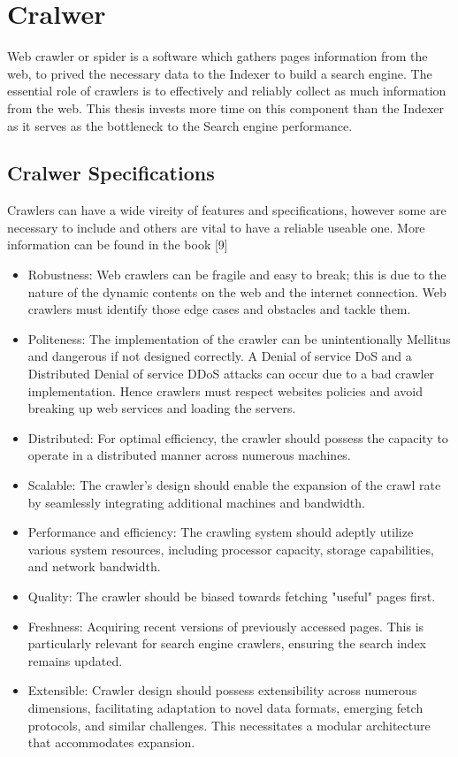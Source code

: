 \section{Cralwer}
Web crawler or spider is a software which gathers pages information from the web, to prived the necessary data to the Indexer to build a search engine. The essential role of crawlers is to effectively and reliably collect as much information from the web. This thesis invests more time on this component than the Indexer as it serves as the bottleneck to the Search engine performance. 

\subsection{Cralwer Specifications}
Crawlers can have a wide vireity of features and specifications, however some are necessary to include and others are vital to have a reliable useable one. More information can be found in the book [9] 

\begin{itemize}
\item Robustness: Web crawlers can be fragile and easy to break; this is due to the nature of the dynamic contents on the web and the internet connection. Web crawlers must identify those edge cases and obstacles and tackle them.  

\item Politeness: The implementation of the crawler can be unintentionally Mellitus and dangerous if not designed correctly. A Denial of service DoS and a Distributed Denial of service DDoS attacks can occur due to a bad crawler implementation. Hence crawlers must respect websites policies and avoid breaking up web services and loading the servers.

\item Distributed: For optimal efficiency, the crawler should possess the capacity to operate in a distributed manner across numerous machines.

\item Scalable: The crawler's design should enable the expansion of the crawl rate by seamlessly integrating additional machines and bandwidth.

\item Performance and efficiency: The crawling system should adeptly utilize various system resources, including processor capacity, storage capabilities, and network bandwidth.

\item Quality: The crawler should be biased towards
fetching "useful" pages first.

\item Freshness: Acquiring recent versions of previously accessed pages. This is particularly relevant for search engine crawlers, ensuring the search index remains updated.

\item Extensible: Crawler design should possess extensibility across numerous dimensions, facilitating adaptation to novel data formats, emerging fetch protocols, and similar challenges. This necessitates a modular architecture that accommodates expansion.
\end{itemize}

